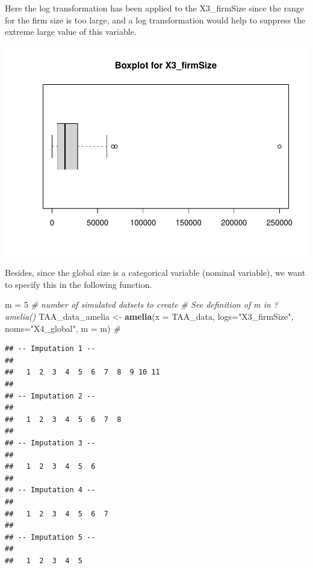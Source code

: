 \documentclass[
]{article}
\newenvironment{Shaded}{\begin{snugshade}}{\end{snugshade}}
\newcommand{\CommentTok}[1]{\textcolor[rgb]{0.56,0.35,0.01}{\textit{#1}}}
\newcommand{\DataTypeTok}[1]{\textcolor[rgb]{0.13,0.29,0.53}{#1}}
\newcommand{\DecValTok}[1]{\textcolor[rgb]{0.00,0.00,0.81}{#1}}
\newcommand{\KeywordTok}[1]{\textcolor[rgb]{0.13,0.29,0.53}{\textbf{#1}}}
\newcommand{\NormalTok}[1]{#1}
\newcommand{\OperatorTok}[1]{\textcolor[rgb]{0.81,0.36,0.00}{\textbf{#1}}}
\newcommand{\StringTok}[1]{\textcolor[rgb]{0.31,0.60,0.02}{#1}}
\begin{document}
Here the log transformation has been applied to the X3\_firmSize since
the range for the firm size is too large, and a log transformation would
help to suppress the extreme large value of this variable.

\begin{Shaded}
\end{Shaded}

\includegraphics{markdown_report_files/figure-latex/unnamed-chunk-11-1.pdf}

Besides, since the global size is a categorical variable (nominal
variable), we want to specify this in the following function.

\begin{Shaded}
\begin{Highlighting}[]
\NormalTok{m =}\StringTok{ }\DecValTok{5} \CommentTok{# number of simulated datsets to create # See definition of m in ?amelia()}
\NormalTok{TAA_data_amelia <-}\StringTok{ }\KeywordTok{amelia}\NormalTok{(}\DataTypeTok{x =}\NormalTok{ TAA_data, }\DataTypeTok{logs=}\StringTok{"X3_firmSize"}\NormalTok{, }\DataTypeTok{noms=}\StringTok{"X4_global"}\NormalTok{, }\DataTypeTok{m =}\NormalTok{ m) }\CommentTok{# }
\end{Highlighting}
\end{Shaded}

\begin{verbatim}
## -- Imputation 1 --
## 
##   1  2  3  4  5  6  7  8  9 10 11
## 
## -- Imputation 2 --
## 
##   1  2  3  4  5  6  7  8
## 
## -- Imputation 3 --
## 
##   1  2  3  4  5  6
## 
## -- Imputation 4 --
## 
##   1  2  3  4  5  6  7
## 
## -- Imputation 5 --
## 
##   1  2  3  4  5
\end{verbatim}
\end{document}
